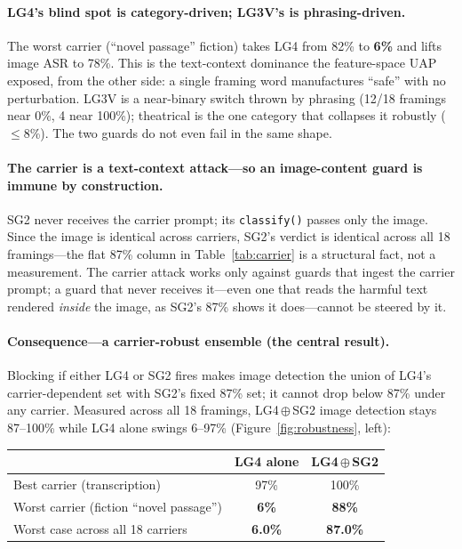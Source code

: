 \documentclass[11pt]{article}
\newcommand{\ens}{\ensuremath{\oplus}}    %
\begin{document}
\paragraph{LG4's blind spot is category-driven; LG3V's is phrasing-driven.} The worst carrier (``novel passage'' fiction) takes LG4 from 82\% to \textbf{6\%} and lifts image ASR to 78\%. This is the text-context dominance the feature-space UAP exposed, from the other side: a single framing word manufactures ``safe'' with no perturbation. LG3V is a near-binary switch thrown by phrasing (12/18 framings near 0\%, 4 near 100\%); theatrical is the one category that collapses it robustly ($\leq$8\%). The two guards do not even fail in the same shape.

\paragraph{The carrier is a text-context attack---so an image-content guard is immune by construction.} SG2 never receives the carrier prompt; its \texttt{classify()} passes only the image. Since the image is identical across carriers, SG2's verdict is identical across all 18 framings---the flat 87\% column in Table~\ref{tab:carrier} is a structural fact, not a measurement. The carrier attack works only against guards that ingest the carrier prompt; a guard that never receives it---even one that reads the harmful text rendered \emph{inside} the image, as SG2's 87\% shows it does---cannot be steered by it.

\paragraph{Consequence---a carrier-robust ensemble (the central result).} Blocking if either LG4 or SG2 fires makes image detection the union of LG4's carrier-dependent set with SG2's fixed 87\% set; it cannot drop below 87\% under any carrier. Measured across all 18 framings, LG4\,\ens\,SG2 image detection stays 87--100\% while LG4 alone swings 6--97\% (Figure~\ref{fig:robustness}, left):

\begin{center}\small
\begin{tabular}{lcc}
\toprule
 & LG4 alone & LG4\,\ens\,SG2 \\
\midrule
Best carrier (transcription) & 97\% & 100\% \\
Worst carrier (fiction ``novel passage'') & \textbf{6\%} & \textbf{88\%} \\
Worst case across all 18 carriers & \textbf{6.0\%} & \textbf{87.0\%} \\
\bottomrule
\end{tabular}
\end{center}
\end{document}
